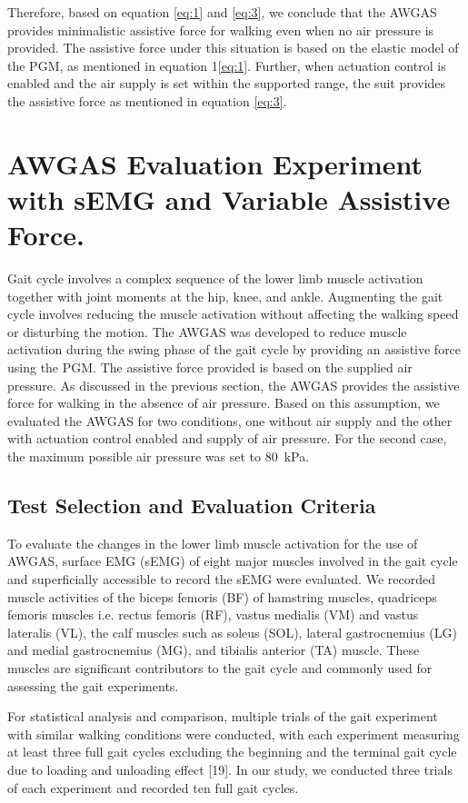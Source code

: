 \documentclass[paper,JRM,paper]{jaciiiarticle}
\begin{document}
Therefore, based on equation \ref{eq:1} and \ref{eq:3}, we conclude that the AWGAS provides minimalistic assistive force for walking even when no air pressure is provided. The assistive force under this situation is based on the elastic model of the PGM, as mentioned in equation 1\ref{eq:1}. Further, when actuation control is enabled and the air supply is set within the supported range, the suit provides the assistive force as mentioned in equation \ref{eq:3}.

\section{AWGAS Evaluation Experiment with sEMG and Variable Assistive Force.}

Gait cycle involves a complex sequence of the lower limb muscle activation together with joint moments at the hip, knee, and ankle. Augmenting the gait cycle involves reducing the muscle activation without affecting the walking speed or disturbing the motion. The AWGAS was developed to reduce muscle activation during the swing phase of the gait cycle by providing an assistive force using the PGM. The assistive force provided is based on the supplied air pressure. As discussed in the previous section, the AWGAS provides the assistive force for walking in the absence of air pressure. Based on this assumption, we evaluated the AWGAS for two conditions, one without air supply and the other with actuation control enabled and supply of air pressure. For the second case, the maximum possible air pressure was set to \SI{80}{\kilo\pascal}.

\subsection{Test Selection and Evaluation Criteria}
To evaluate the changes in the lower limb muscle activation for the use of AWGAS, surface EMG (sEMG) of eight major muscles involved in the gait cycle and superficially accessible to record the sEMG were evaluated. We recorded muscle activities of the biceps femoris (BF) of hamstring muscles, quadriceps femoris muscles i.e. rectus femoris (RF), vastus medialis (VM) and vastus lateralis (VL), the calf muscles such as soleus (SOL), lateral gastrocnemius (LG) and medial gastrocnemius (MG), and tibialis anterior (TA) muscle. These muscles are significant contributors to the gait cycle and commonly used for assessing the gait experiments. 

For statistical analysis and comparison, multiple trials of the gait experiment with similar walking conditions were conducted, with each experiment measuring at least three full gait cycles excluding the beginning and the terminal gait cycle due to loading and unloading effect [19]. In our study, we conducted three trials of each experiment and recorded ten full gait cycles. 
\end{document}
